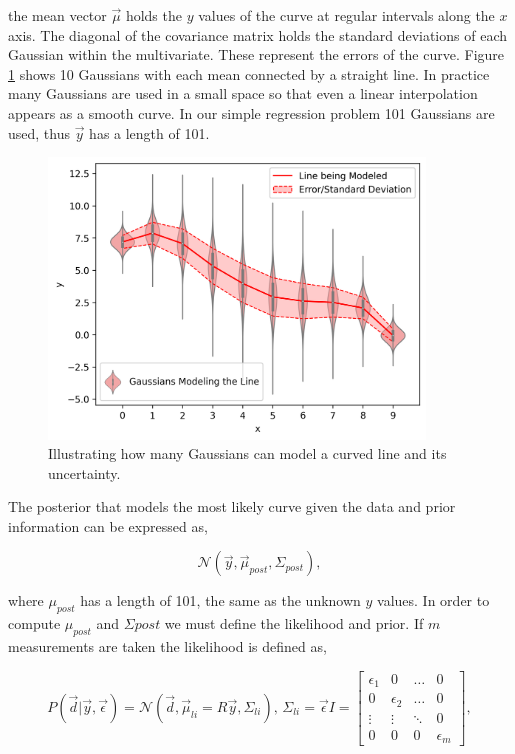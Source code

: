 \noindent the mean vector $\vec{\mu}$ holds the $y$ values of the curve at regular intervals along the $x$ axis. The diagonal of the covariance matrix holds the standard deviations of each Gaussian within the multivariate. These represent the errors of the curve. Figure \ref{fig:mvg} shows 10 Gaussians with each mean connected by a straight line. In practice many Gaussians are used in a small space so that even a linear interpolation appears as a smooth curve. In our simple regression problem 101 Gaussians are used, thus $\vec y$ has a length of 101. 

\begin{figure}
  \centering
  \includegraphics[width=10cm]{images/mvg.png}
  \caption{Illustrating how many Gaussians can model a curved line and its uncertainty.}
  \label{fig:mvg}
\end{figure}

\noindent The posterior that models the most likely curve given the data and prior information can be expressed as,

\begin{equation}
  \mathcal{N}(\vec y, \vec{\mu}_{post}, \Sigma_{post}),
\end{equation}

where $\mu_{post}$ has a length of 101, the same as the unknown $y$ values. In order to compute $\mu_{post}$ and $\Sigma{post}$ we must define the likelihood and prior. If $m$ measurements are taken the likelihood is defined as, 

\begin{equation}
  P(\vec{d}|\vec{y},\vec \epsilon) = \mathcal{N}(\vec{d}, \vec \mu_{li} = R\vec{y}, \Sigma_{li}),\, \Sigma_{li} = \vec{\epsilon}I = 
    \begin{bmatrix}
        \epsilon_1 & 0 & \hdots & 0\\
        0 & \epsilon_2 & \hdots & 0\\
        \vdots & \vdots & \ddots & 0 \\
        0 & 0 & 0 &\epsilon_m
    \end{bmatrix},
  \label{eq:likelihood}
\end{equation}

